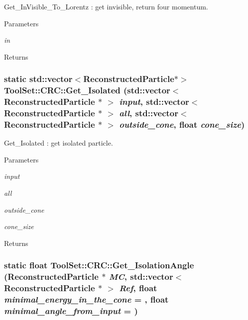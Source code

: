 Get\_\-InVisible\_\-To\_\-Lorentz : get invisible, return four momentum. 
\begin{DoxyParams}{Parameters}
\item[{\em in}]\end{DoxyParams}
\begin{DoxyReturn}{Returns}

\end{DoxyReturn}
\hypertarget{classToolSet_1_1CRC_ae38bc9fed9fc07e1cea7543dca8920c2}{
\subsubsection[{Get\_\-Isolated}]{\setlength{\rightskip}{0pt plus 5cm}static std::vector$<$ReconstructedParticle$\ast$$>$ ToolSet::CRC::Get\_\-Isolated (std::vector$<$ ReconstructedParticle $\ast$ $>$ {\em input}, \/  std::vector$<$ ReconstructedParticle $\ast$ $>$ {\em all}, \/  std::vector$<$ ReconstructedParticle $\ast$ $>$ {\em outside\_\-cone}, \/  float {\em cone\_\-size})}}
\label{classToolSet_1_1CRC_ae38bc9fed9fc07e1cea7543dca8920c2}


Get\_\-Isolated : get isolated particle. 
\begin{DoxyParams}{Parameters}
\item[{\em input}]\item[{\em all}]\item[{\em outside\_\-cone}]\item[{\em cone\_\-size}]\end{DoxyParams}
\begin{DoxyReturn}{Returns}

\end{DoxyReturn}
\hypertarget{classToolSet_1_1CRC_aa04cedd2faab9dc50787a88b0207cc8f}{
\subsubsection[{Get\_\-IsolationAngle}]{\setlength{\rightskip}{0pt plus 5cm}static float ToolSet::CRC::Get\_\-IsolationAngle (ReconstructedParticle $\ast$ {\em MC}, \/  std::vector$<$ ReconstructedParticle $\ast$ $>$ {\em Ref}, \/  float {\em minimal\_\-energy\_\-in\_\-the\_\-cone} = {}, \/  float {\em minimal\_\-angle\_\-from\_\-input} = {})}}
\label{classToolSet_1_1CRC_aa04cedd2faab9dc50787a88b0207cc8f}


